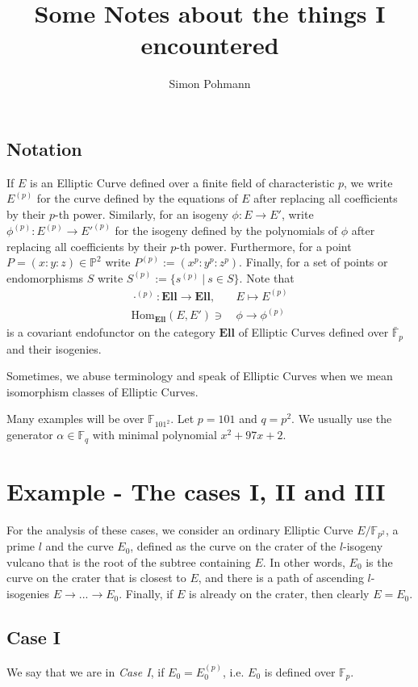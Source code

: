 \documentclass{scrartcl}
\title{Some Notes about the things I encountered}
\author{Simon Pohmann}
\newcommand{\F}{\mathbb{F}}
\theoremstyle{definition}
\begin{document}
\maketitle

\subsection*{Notation}
If $E$ is an Elliptic Curve defined over a finite field of characteristic $p$, we write $E^{(p)}$ for the curve defined by the equations of $E$ after replacing all coefficients by their $p$-th power.
Similarly, for an isogeny $\phi: E \to E'$, write $\phi^{(p)}: E^{(p)} \to E'^{(p)}$ for the isogeny defined by the polynomials of $\phi$ after replacing all coefficients by their $p$-th power.
Furthermore, for a point $P = (x : y : z) \in \mathbb{P}^2$ write $P^{(p)} := (x^p : y^p : z^p)$.
Finally, for a set of points or endomorphisms $S$ write $S^{(p)} := \{ s^{(p)} \ | \ s \in S \}$.
Note that
\begin{align*}
    \cdot^{(p)}: \mathrm{\textbf{Ell}} \to \mathrm{\textbf{Ell}}, \quad &E \mapsto E^{(p)} \\
    \mathrm{Hom}_{\mathrm{\textbf{Ell}}}(E, E') \ni &\phi \to \phi^{(p)}
\end{align*}
is a covariant endofunctor on the category $\mathrm{\textbf{Ell}}$ of Elliptic Curves defined over $\bar{\F}_p$ and their isogenies.

Sometimes, we abuse terminology and speak of Elliptic Curves when we mean isomorphism classes of Elliptic Curves.

Many examples will be over $\F_{101^2}$.
Let $p = 101$ and $q = p^2$.
We usually use the generator $\alpha \in \F_q$ with minimal polynomial $x^2 + 97 x + 2$.

\section{Example - The cases I, II and III}
For the analysis of these cases, we consider an ordinary Elliptic Curve $E/\F_{p^2}$, a prime $l$ and the curve $E_0$, defined as the curve on the crater of the $l$-isogeny vulcano that is the root of the subtree containing $E$.
In other words, $E_0$ is the curve on the crater that is closest to $E$, and there is a path of ascending $l$-isogenies $E \to ... \to E_0$.
Finally, if $E$ is already on the crater, then clearly $E = E_0$.

\subsection{Case I}
We say that we are in \emph{Case I}, if $E_0 = E_0^{(p)}$, i.e. $E_0$ is defined over $\F_p$.
\end{document}
